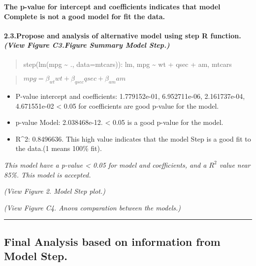 \documentclass[11pt,]{article}
\begin{document}
\textbf{The p-value for intercept and coefficients indicates that model
Complete is not a good model for fit the data.}

\paragraph{\texorpdfstring{2.3.Propose and analysis of alternative model
using step R function. \emph{(View Figure C3.Figure Summary Model
Step.)}}{2.3.Propose and analysis of alternative model using step R function. (View Figure C3.Figure Summary Model Step.)}}\label{propose-and-analysis-of-alternative-model-using-step-r-function.-view-figure-c3.figure-summary-model-step.}

\begin{quote}
step(lm(mpg \textasciitilde{} ., data=mtcars)): lm, mpg
\textasciitilde{} wt + qsec + am, mtcars
\end{quote}

\begin{quote}
\(mpg =\beta_{wt}wt+\beta_{qsec}qsec+\beta_{am}am\)
\end{quote}

\begin{itemize}
\itemsep1pt\parskip0pt
\item
  P-value intercept and coefficients: 1.779152e-01, 6.952711e-06,
  2.161737e-04, 4.671551e-02 \textless{} 0.05 for coefficients are good
  p-value for the model.
\item
  p-value Model: 2.038468e-12. \textless{} 0.05 is a good p-value for
  the model.
\item
  R\^{}2: 0.8496636. This high value indicates that the model Step is a
  good fit to the data.(1 means 100\% fit).
\end{itemize}

\emph{This model have a p-value \textless{} 0.05 for model and
coefficients, and a \(R^2\) value near 85\%. This model is accepted.}

\emph{(View Figure 2. Model Step plot.)}

\emph{(View Figure C4. Anova comparation between the models.)}

\begin{center}\rule{0.5\linewidth}{\linethickness}\end{center}

\subsection{Final Analysis based on information from Model
Step.}\label{final-analysis-based-on-information-from-model-step.}
\end{document}
